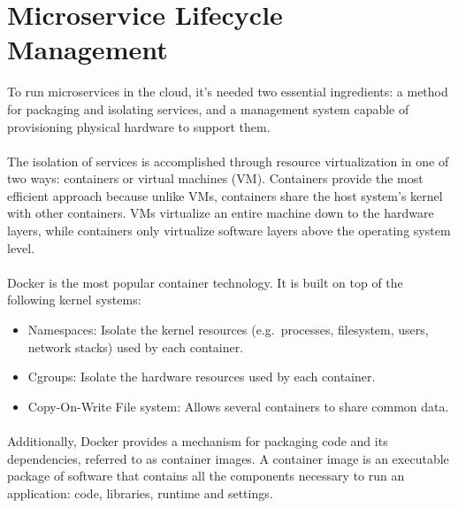 \section{Microservice Lifecycle Management} %
\label{sec:microservice_lifecycle_management}

To run microservices in the cloud, it's needed two essential ingredients: a method for packaging and isolating services,
and a management system capable of provisioning physical hardware to support them.

\paragraph{}

The isolation of services is accomplished through resource virtualization in one of two ways: containers or virtual machines (VM).
Containers provide the most efficient approach because unlike VMs, containers share the host system’s kernel with other containers.
VMs virtualize an entire machine down to the hardware layers, while containers only virtualize software layers above the operating system level.

\paragraph{}

Docker \cite{docker} is the most popular container technology. It is built on top of the following kernel systems:
\begin{itemize}
    \item Namespaces: Isolate the kernel resources (e.g.\ processes, filesystem, users, network stacks) used by each container.
    \item Cgroups: Isolate the hardware resources used by each container.
    \item Copy-On-Write File system: Allows several containers to share common data.
\end{itemize}

\paragraph{}

Additionally, Docker provides a mechanism for packaging code and its dependencies, referred to as container images.
A container image is an executable package of software that contains all the components necessary to run an application: code, libraries, runtime and settings.

